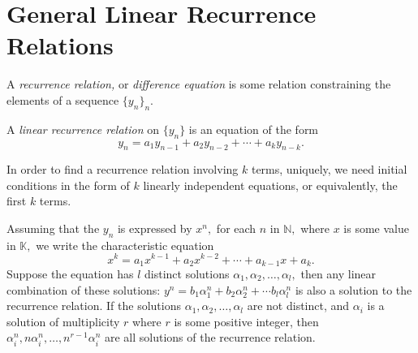 
\section{General Linear Recurrence Relations}

\begin{definition}
	A \emph{recurrence relation,} or \emph{difference equation} is some relation constraining the elements of a sequence $\{ y_n \}_n.$
\end{definition}

A \emph{linear recurrence relation} on $\{ y_n \}$ is an equation
of the form 
$$ y_n = a_1 y_{n-1} + a_2 y_{n-2} + \cdots + a_k y_{n-k}.$$

\begin{remark}
	In order to find a recurrence relation involving $k$ terms, uniquely, we need
	initial conditions in the form of $k$ linearly independent
	equations, or equivalently, the first $k$ terms.
\end{remark}

Assuming that the $y_n$ is expressed by $x^n,$ for each $n$ in 
$\mathbb{N},$ where $x$ is some value in $\mathbb{K},$
we write the characteristic equation 
$$x^k = a_1 x^{k-1} + a_2 x^{k-2} + \cdots + a_{k-1} x + a_k.$$
Suppose the equation has $l$ distinct solutions $\alpha_1, \alpha_2,
\dotsc, \alpha_l,$ then any linear combination of these solutions:
$y^n = b_1 \alpha_1^n + b_2 \alpha_2^n + \cdots b_l \alpha_l^n$ is 
also a solution to the recurrence relation.
If the solutions $\alpha_1, \alpha_2, \dotsc, \alpha_l$ are not
distinct, and $\alpha_i$ is a solution of multiplicity $r$ where 
$r$ is some positive integer, then $\alpha_i^n, n \alpha_i^n, \dotsc,
n^{r-1} \alpha_i^n$ are all solutions of the recurrence relation.

